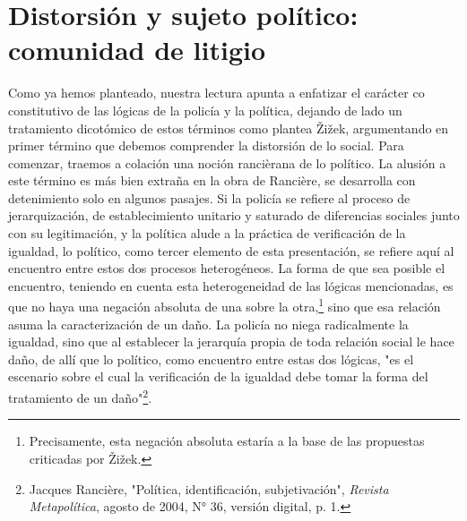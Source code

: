 \section{Distorsión y sujeto político: comunidad de litigio}

Como ya hemos planteado, nuestra lectura apunta a enfatizar el carácter
co constitutivo de las lógicas de la policía y la política, dejando de
lado un tratamiento dicotómico de estos términos como plantea Žižek,
argumentando en primer término que debemos comprender la distorsión de
lo social. Para comenzar, traemos a colación una noción rancièrana de lo
político. La alusión a este término es más bien extraña en la obra de
Rancière, se desarrolla con detenimiento solo en algunos pasajes. Si la
policía se refiere al proceso de jerarquización, de establecimiento
unitario y saturado de diferencias sociales junto con su legitimación, y
la política alude a la práctica de verificación de la igualdad, lo
político, como tercer elemento de esta presentación, se refiere aquí al
encuentro entre estos dos procesos heterogéneos. La forma de que sea
posible el encuentro, teniendo en cuenta esta heterogeneidad de las
lógicas mencionadas, es que no haya una negación absoluta de una sobre
la otra,\footnote{Precisamente, esta negación absoluta estaría a la base
  de las propuestas criticadas por Žižek.} sino que esa relación asuma
la caracterización de un daño. La policía no niega radicalmente la
igualdad, sino que al establecer la jerarquía propia de toda relación
social le hace daño, de allí que lo político, como encuentro entre estas
dos lógicas, "es el escenario sobre el cual la verificación de la
igualdad debe tomar la forma del tratamiento de un daño"\footnote{Jacques
  Rancière, "Política, identificación, subjetivación", \emph{Revista
  Metapolítica}, agosto de 2004, N° 36, versión digital, p. 1.}.

